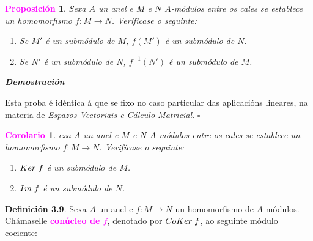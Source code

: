 \documentclass[twoside]{report}
\newcommand{\magbf}[1]{\textcolor{magenta}{\textbf{#1}}} %
\theoremstyle{mystyle}
\newtheorem{prop}{\magbf{Proposición}}[chapter]
\newtheorem{cor}{\magbf{Corolario}}[chapter]
\newenvironment{proposition}
{\begin{mdframed}[linecolor = magenta,backgroundcolor = classicrose, linewidth = 2mm]\begin{prop}}
{\end{prop}\end{mdframed}}
\newenvironment{corollary}
{\begin{mdframed}[linecolor = magenta,backgroundcolor = classicrose, linewidth = 2mm]\begin{cor}}
{\end{cor}\end{mdframed}}
\begin{document}
\begin{proposition} \label{prop3.7}
Sexa $A$ un anel e $M$ e $N$ $A$-módulos entre os cales se establece un homomorfismo $f: M \longrightarrow N$. Verifícase o seguinte:
\begin{enumerate}
    \item Se $M'$ é un submódulo de $M$, $f(M')$ é un submódulo de $N$.
    \item Se $N'$ é un submódulo de $N$, $f^{-1}(N')$ é un submódulo de $M$.
\end{enumerate}
\end{proposition}

\vspace{2mm}

\noindent \textbf{\textit{\underline{Demostración}}}

\vspace{2mm}

\noindent Esta proba é idéntica á que se fixo no caso particular das aplicacións lineares, na materia de \textit{Espazos Vectoriais e Cálculo Matricial}. $\square$\\

\pagebreak

\begin{corollary} \label{cor3.1}
exa $A$ un anel e $M$ e $N$ $A$-módulos entre os cales se establece un homomorfismo $f: M \longrightarrow N$. Verifícase o seguinte:
\begin{enumerate}
    \item $Ker \hspace{1mm} f$ é un submódulo de $M$.
    \item $Im \hspace{1mm} f$ é un submódulo de $N$.
\end{enumerate}
\end{corollary}

\vspace{3mm}

\noindent \textbf{Definición 3.9}. Sexa $A$ un anel e $f: M \longrightarrow N$ un homomorfismo de $A$-módulos. Chámaselle \magbf{conúcleo de $f$}, denotado por \magbf{$CoKer \hspace{1mm} f$}, ao seguinte módulo cociente:

\begin{center}
\end{center}
\end{document}
